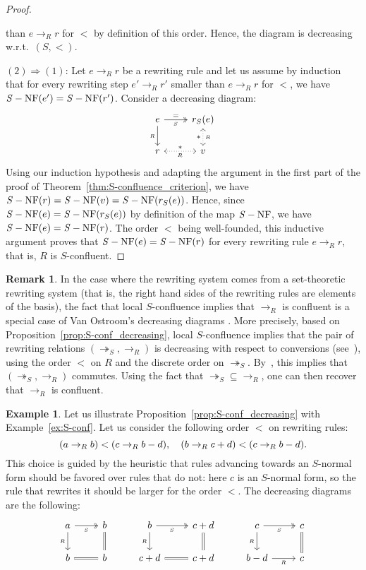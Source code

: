 \documentclass[10pt]{easychair}
\theoremstyle{definition}
\newtheorem{remark}[theorem]{Remark}
\newtheorem{example}[theorem]{Example}
\newcommand\rewR{\to_R}
\newcommand\rewS{\twoheadrightarrow_S}
\DeclareMathOperator{\SNF}{{\it S}-NF}
\begin{document}
\begin{proof}
\begin{itemize}
    than $e\rewR r$ for $<$ by definition of this order. Hence, the
    diagram is decreasing w.r.t.\ $(S,<)$.
  \end{itemize}
  $(2)\Rightarrow (1)$: Let $e\rewR r$ be a rewriting rule and let us
  assume by induction that for every rewriting step $e'\rewR r'$ smaller
  than $e\rewR r$ for $<$, we have $\SNF(e')=\SNF(r')$. Consider a
  decreasing diagram:
  \[\begin{tikzcd}
  e\ar[d, "_R"']\ar[r, twoheadrightarrow, "=", "_S"'] &
  r_S(e)\ar[d, leftrightarrow, dotted, "*"', "_R"]\\
  r\ar[r, leftrightarrow, dotted, "*", "_R"'] & v
  \end{tikzcd}\]
  Using our induction hypothesis and adapting the argument in the first
  part of the proof of Theorem~\ref{thm:S-confluence_criterion}, we have
  $\SNF(r)=\SNF(v)=\SNF(r_S(e))$. Hence, since $\SNF(e)=\SNF(r_S(e))$ by
  definition of the map $\SNF$, we have $\SNF(e)=\SNF(r)$. The order
  $<$ being well-founded, this inductive argument proves that
  $\SNF(e)=\SNF(r)$ for every rewriting rule $e\rewR r$, that is, $R$ is
  $S$-confluent.
\end{proof}
\smallskip

\begin{remark}
  In the case where the rewriting system comes from a set-theoretic rewriting
  system (that is, the right hand sides of the rewriting rules are elements of
  the basis), the fact that local $S$-confluence implies that $\rewR$ is
  confluent is a special case of Van Ostroom's decreasing diagrams
  \cite{van2008confluence}. More precisely, based on
  Proposition~\ref{prop:S-conf_decreasing}, local $S$-confluence implies
  that the pair of rewriting relations $(\rewS,\rewR)$ is decreasing with
  respect to conversions (see~\cite[Definition 3]{van2008confluence}),
  using the order $<$ on $R$ and the discrete order on $\rewS$.
  By~\cite[Theorem 3]{van2008confluence}, this implies that
  $(\rewS,\rewR)$ commutes. Using the fact that $\rewS \subseteq \rewR$,
  one can then recover that $\rewR$ is confluent.
\end{remark}
\smallskip

\begin{example}\label{ex:end_to_example}
  Let us illustrate Proposition~\ref{prop:S-conf_decreasing} with
  Example~\ref{ex:S-conf}. Let us consider the following order $<$ on
  rewriting rules:
  \[(a\rewR b)<(c\rewR b-d),\quad(b\rewR c+d)<(c\rewR b-d).
  \smallskip\]
  This choice is guided by the heuristic that rules advancing towards an
  $S$-normal form should be favored over rules that do not: here $c$ is
  an $S$-normal form, so the rule that rewrites it should be larger for
  the order $<$. The decreasing diagrams are the following:
  \[\begin{tikzcd}
  a\ar[d, "_R"']\ar[r, twoheadrightarrow, "_S"'] &
  b\ar[d, equal] & b\ar[d, "_R"']
  \ar[r, twoheadrightarrow, "_S"'] & c+d\ar[d, equal] &
  c\ar[d, "_R"']\ar[r, twoheadrightarrow, "_S"'] & c\ar[d,equal]\\
  b\ar[r, equal] & b & c+d\ar[r, equal] & c+d & b-d\ar[r,  "_R"'] & c
  \end{tikzcd}\]
\end{example}
\smallskip
\end{document}
